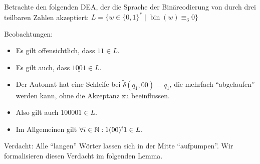 \begin{Bsp*} Betrachte den folgenden \ac{DEA}, der die Sprache der Binärcodierung von durch drei teilbaren Zahlen akzeptiert:
                $L = \{ w\in \{0,1\}^* \mid \operatorname{bin}(w)\equiv_3 0\}$
    \begin{center}
  \end{center}
  Beobachtungen:
  \begin{itemize}
  \item Es gilt offensichtlich, dass $11 \in L$.
  \item Es gilt auch, dass $1 \underline{0 0} 1 \in L$.
  \item Der Automat hat eine Schleife bei $\tilde\delta({q_1,00}) = q_1$, die mehrfach "`abgelaufen"' werden kann, ohne die Akzeptanz zu beeinflussen.
  \item Also gilt auch $100001 \in L$.
  \item Im Allgemeinen gilt $\forall i\in\mathbb{N}: 1(00)^i1 \in L$.
  \qedhere
  \end{itemize}
\end{Bsp*}
Verdacht: Alle "`langen"' Wörter lassen sich in der Mitte "`aufpumpen"'.
Wir formalisieren diesen Verdacht im folgenden Lemma.

